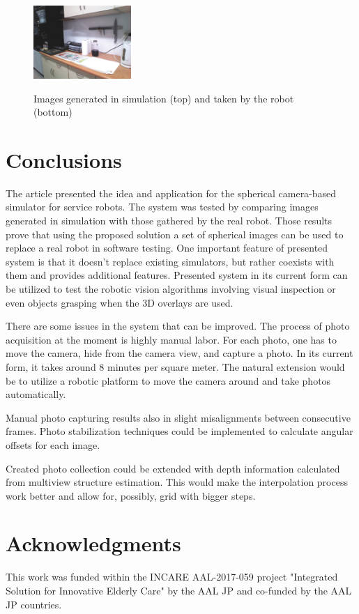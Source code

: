 \documentclass{svproc}
\begin{document}
\begin{figure}[!ht]
    \includegraphics[width=0.33\textwidth]{img/sim_vs_tiago/tia_kuchnia_blat.jpg}\\
    \caption{Images generated in simulation (top) and taken by the robot (bottom)}
    \label{fig:sim_vs_tiago}
\end{figure}\vspace{-5mm}

\section{Conclusions}

The article presented the idea and application for the spherical camera-based 
simulator for service robots. The system was tested by comparing images generated in simulation
with those gathered by the real robot. Those results prove that using the proposed solution a set 
of spherical images can be used to replace a real robot in software testing.
One important feature of presented system is that it doesn't replace existing simulators,
but rather coexists with them and provides additional features.
Presented system in its current form can be utilized to test the robotic vision algorithms
involving visual inspection \cite{mmar_winiarski_automated-2016} or even objects
grasping \cite{seredynski2016fast} when the 3D overlays are used. 

There are some issues in the system that can be improved. The process of photo acquisition
at the moment is highly manual labor. For each photo, one has to move the camera, hide from
the camera view, and capture a photo. In its current form, it takes around 8 minutes per square meter.
The natural extension would be to utilize a robotic platform to move the camera around and
take photos automatically. 

Manual photo capturing results also in slight misalignments between consecutive frames.
Photo stabilization techniques could be implemented to calculate angular offsets for each
image.

Created photo collection could be extended with depth information calculated from multiview
structure estimation. This would make the interpolation process work better and allow for, 
possibly, grid with bigger steps.

\section*{Acknowledgments}
\label{sec:acknowledgments}
This work was funded within the INCARE AAL-2017-059 project "Integrated Solution for Innovative Elderly
Care" by the AAL JP and co-funded by the AAL JP countries.

 

\end{document}
